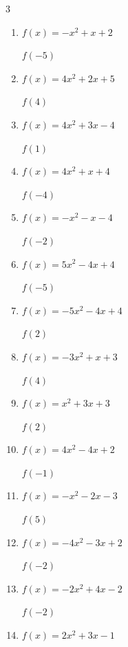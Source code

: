 \begin{multicols}{3}
\begin{enumerate}
$f(-5)$
        \phantom{$= 103$}

  \item $f(x)=-x^{2}+x+2$

$f(-5)$
        \phantom{$= -28$}

  \item $f(x)=4x^{2}+2x+5$

$f(4)$
        \phantom{$= 77$}

  \item $f(x)=4x^{2}+3x-4$

$f(1)$
        \phantom{$= 3$}

  \item $f(x)=4x^{2}+x+4$

$f(-4)$
        \phantom{$= 64$}

  \item $f(x)=-x^{2}-x-4$

$f(-2)$
        \phantom{$= -6$}

  \item $f(x)=5x^{2}-4x+4$

$f(-5)$
        \phantom{$= 149$}

\columnbreak %

  \item $f(x)=-5x^{2}-4x+4$

$f(2)$
        \phantom{$= -24$}

  \item $f(x)=-3x^{2}+x+3$

$f(4)$
        \phantom{$= -41$}

  \item $f(x)=x^{2}+3x+3$

$f(2)$
        \phantom{$= 13$}

  \item $f(x)=4x^{2}-4x+2$

$f(-1)$
        \phantom{$= 10$}

  \item $f(x)=-x^{2}-2x-3$

$f(5)$
        \phantom{$= -38$}

  \item $f(x)=-4x^{2}-3x+2$

$f(-2)$
        \phantom{$= -8$}

  \item $f(x)=-2x^{2}+4x-2$

$f(-2)$
        \phantom{$= -18$}

  \item $f(x)=2x^{2}+3x-1$


\end{enumerate}
\end{multicols}
